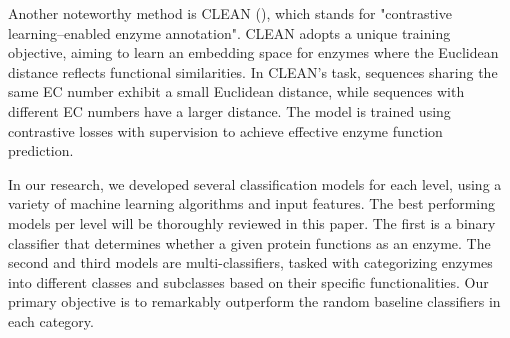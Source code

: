 \documentclass{bioinfo}
\begin{document}
Another noteworthy method is CLEAN (\cite{CleanArticle}), which stands for "contrastive learning–enabled 
enzyme annotation". CLEAN adopts a unique training objective, aiming to learn an embedding space for enzymes where the Euclidean distance 
reflects functional similarities. In CLEAN's task, sequences sharing the same EC number exhibit a small Euclidean distance, while sequences 
with different EC numbers have a larger distance. The model is trained using contrastive losses with supervision to achieve effective 
enzyme function prediction.

In our research, we developed several classification models for each level, using a variety of machine learning algorithms and input features.
The best performing models per level will be thoroughly reviewed in this paper.
The first is a binary classifier that determines whether a given protein functions as an enzyme. 
The second and third models are  multi-classifiers, tasked with categorizing enzymes into different classes and subclasses 
based on their specific functionalities. 
Our primary objective is to remarkably outperform the random baseline classifiers in each category.
\end{document}
